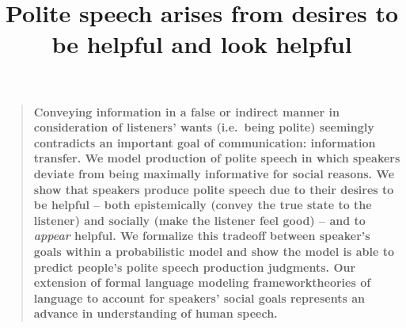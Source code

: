 \documentclass[12pt]{article}
\title{Polite speech arises from desires to be helpful and look helpful}
\author
%
{Erica J. Yoon,$^{1\ast\dagger}$ Michael Henry Tessler,$^{1\ast}$ Noah D. Goodman,$^{1}$ Michael C. Frank$^{1}$\\
\\
\normalsize{$^{1}$Department of Psychology, Stanford University,}\\
\normalsize{450 Serra Mall, Stanford, CA 94305.}\\
\\
\normalsize{$^\ast$These authors contributed equally to this work.}
\\
\normalsize{$^\dagger$To whom correspondence should be addressed; E-mail: ejyoon@stanford.edu.}
}
\date{}
\newenvironment{sciabstract}{%
\begin{quote} \bf}
{\end{quote}}
\begin{document}
 


\baselineskip24pt


\maketitle 




\begin{sciabstract}
Conveying information in a false or indirect manner in consideration of
listeners' wants (i.e.~being polite) seemingly contradicts an important
goal of communication: information transfer. We model production
of polite speech in which speakers deviate from being maximally
informative for social reasons. We show that speakers produce polite
speech due to their desires to be helpful -- both epistemically (convey
the true state to the listener) and socially (make the listener feel
good) -- and to \emph{appear} helpful. We formalize this tradeoff
between speaker's goals within a probabilistic model and show the model
is able to predict people's polite speech production judgments. Our
extension of formal language modeling frameworktheories of language to account for speakers' social
goals represents an advance in understanding of human speech.
\end{sciabstract}



\end{document}
